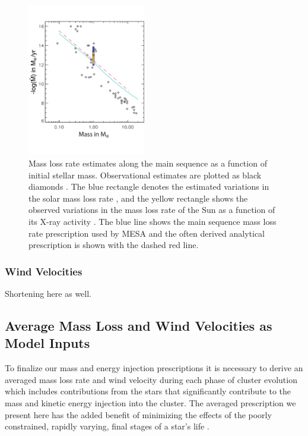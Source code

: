 \documentclass[fleqn,usenatbib]{mnras}
\begin{document}
\begin{figure}
\centering\includegraphics[width=0.46\textwidth]{mdotms_withAnalytic_mod3.pdf}
\caption{Mass loss rate estimates along the main sequence as a function of initial stellar mass.  Observational estimates are plotted as black diamonds \citep{cranmer2011,dejager1988,searle2008,waters1987,debes2006,badalyan1992,morin2008}.  The blue rectangle denotes the estimated variations in the solar mass loss rate \citep{wood2005}, and the yellow rectangle shows the observed variations in the mass loss rate of the Sun as a function of its X-ray activity \citep{cohen2011}.  The blue line shows the main sequence mass loss rate prescription used by MESA and the often derived analytical prescription is shown with the dashed red line. }
\label{fig:msmassloss}
\end{figure} 


\subsubsection{Wind Velocities}


Shortening here as well.

\subsection{Average Mass Loss and Wind Velocities as Model Inputs} \label{section:averages}

To finalize our mass and energy injection prescriptions it is necessary to derive an averaged mass loss rate and wind velocity during each phase of cluster evolution which includes contributions from the stars that significantly contribute to the mass and kinetic energy injection into the cluster.
The averaged prescription we present here has the added benefit of minimizing the effects of the poorly constrained, rapidly varying, final stages of a star's life \citep{pooley2006}.
\end{document}
